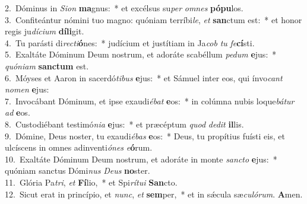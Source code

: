 {2.~}Dóminus in \textit{Si}\textit{on} \textbf{ma}gnus:~* et excélsus su\textit{per} \textit{om}\textit{nes} \textbf{pó}\textbf{pu}los.\\
{3.~}Confiteántur nómini tuo magno: quóniam terríbi\textit{le}, \textit{et} \textbf{san}ctum est:~* et honor regis ju\textit{dí}\textit{ci}\textit{um} \textbf{dí}\textbf{li}git.\\
{4.~}Tu parásti di\textit{re}\textit{cti}\textbf{ó}nes:~* judícium et justítiam in Ja\textit{cob} \textit{tu} \textit{fe}\textbf{cí}sti.\\
{5.~}Exaltáte Dóminum Deum nostrum, et adoráte scabéllum \textit{pe}\textit{dum} \textbf{e}jus:~* \textit{quó}\textit{ni}\textit{am} \textbf{san}\textbf{ctum} est.\\
{6.~}Móyses et Aaron in sacerdó\textit{ti}\textit{bus} \textbf{e}jus:~* et Sámuel inter eos, qui ínvo\textit{cant} \textit{no}\textit{men} \textbf{e}jus:\\
{7.~}Invocábant Dóminum, et ipse exaudi\textit{é}\textit{bat} \textbf{e}os:~* in colúmna nubis loque\textit{bá}\textit{tur} \textit{ad} \textbf{e}os.\\
{8.~}Custodiébant testimó\textit{ni}\textit{a} \textbf{e}jus:~* et præcéptum \textit{quod} \textit{de}\textit{dit} \textbf{il}lis.\\
{9.~}Dómine, Deus noster, tu exaudi\textit{é}\textit{bas} \textbf{e}os:~* Deus, tu propítius fuísti eis, et ulcíscens in omnes adinventi\textit{ó}\textit{nes} \textit{e}\textbf{ó}rum.\\
{10.~}Exaltáte Dóminum Deum nostrum, et adoráte in monte \textit{san}\textit{cto} \textbf{e}jus:~* quóniam sanctus Dómi\textit{nus} \textit{De}\textit{us} \textbf{no}ster.\\
{11.~}Glória Pa\textit{tri}, \textit{et} \textbf{Fí}lio,~* et Spi\textit{rí}\textit{tu}\textit{i} \textbf{San}cto.\\
{12.~}Sicut erat in princípio, et \textit{nunc}, \textit{et} \textbf{sem}per,~* et in sǽcula sæ\textit{cu}\textit{ló}\textit{rum}. \textbf{A}men.\\

